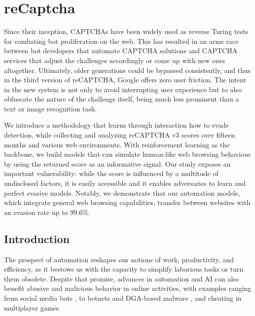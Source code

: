\chapter{reCaptcha}\label{ch:recaptcha}

Since their inception, CAPTCHAs have been widely used as reverse Turing tests for combating bot proliferation on the web.
This has resulted in an arms race between bot developers that automate CAPTCHA solutions and CAPTCHA services that adjust the challenges accordingly or come up with new ones altogether.
Ultimately, older generations could be bypassed consistently, and thus in the third version of reCAPTCHA, Google offers zero user friction.
The intent in the new system is not only to avoid interrupting user experience but to also obfuscate the nature of the challenge itself, being much less prominent than a text or image recognition task.

We introduce a methodology that learns through interaction how to evade detection, while collecting and analyzing reCAPTCHA v3 scores over fifteen months and various web environments.
With reinforcement learning as the backbone, we build models that can simulate human-like web browsing behaviour by using the returned score as an informative signal.
Our study exposes an important vulnerability: while the score is influenced by a multitude of undisclosed factors, it is easily accessible and it enables adversaries to learn and perfect evasive models.
Notably, we demonstrate that our automation models, which integrate general web browsing capabilities, transfer between websites with an evasion rate up to 99.6\%.

\section{Introduction}
The prospect of automation reshapes our notions of work, productivity, and efficiency, as it bestows us with the capacity to simplify laborious tasks or turn them obsolete.
Despite that promise, advances in automation and AI can also benefit abusive and malicious behavior in online activities, with examples ranging from social media bots \cite{chu2012detecting}, to botnets and DGA-based malware \cite{antonakakis2012throw}, and cheating in multiplayer games \cite{chow2010captcha}

